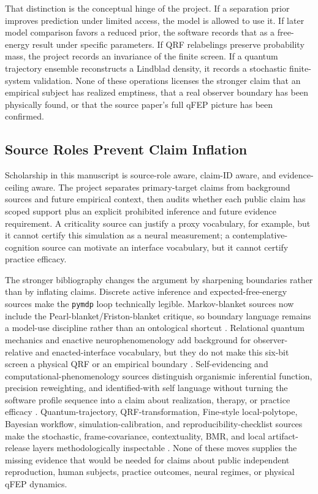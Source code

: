 \documentclass[
]{article}
\begin{document}
That distinction is the conceptual hinge of the project. If a separation
prior improves prediction under limited access, the model is allowed to
use it. If later model comparison favors a reduced prior, the software
records that as a free-energy result under specific parameters. If QRF
relabelings preserve probability mass, the project records an invariance
of the finite screen. If a quantum trajectory ensemble reconstructs a
Lindblad density, it records a stochastic finite-system validation. None
of these operations licenses the stronger claim that an empirical
subject has realized emptiness, that a real observer boundary has been
physically found, or that the source paper's full qFEP picture has been
confirmed.

\subsection{Source Roles Prevent Claim
Inflation}\label{sec:discussion-source-role-boundaries}

Scholarship in this manuscript is source-role aware, claim-ID aware, and
evidence-ceiling aware. The project separates primary-target claims from
background sources and future empirical context, then audits whether
each public claim has scoped support plus an explicit prohibited
inference and future evidence requirement. A criticality source can
justify a proxy vocabulary, for example, but it cannot certify this
simulation as a neural measurement; a contemplative-cognition source can
motivate an interface vocabulary, but it cannot certify practice
efficacy.

The stronger bibliography changes the argument by sharpening boundaries
rather than by inflating claims. Discrete active inference and
expected-free-energy sources make the \texttt{pymdp} loop technically
legible. Markov-blanket sources now include the
Pearl-blanket/Friston-blanket critique, so boundary language remains a
model-use discipline rather than an ontological shortcut
\citep{bruineberg2022emperor}. Relational quantum mechanics and enactive
neurophenomenology add background for observer-relative and
enacted-interface vocabulary, but they do not make this six-bit screen a
physical QRF or an empirical boundary
\citep{rovelli1996relational, varela1991embodied}. Self-evidencing and
computational-phenomenology sources distinguish organismic inferential
function, precision reweighting, and identified-with self language
without turning the software profile sequence into a claim about
realization, therapy, or practice efficacy
\citep{hohwy2026selfevidencingagent, tal2026advancedmeditation, prest2026lettinggo, prest2026selfingwithoutself}.
Quantum-trajectory, QRF-transformation, Fine-style local-polytope,
Bayesian workflow, simulation-calibration, and reproducibility-checklist
sources make the stochastic, frame-covariance, contextuality, BMR, and
local artifact-release layers methodologically inspectable
\citep{fine1982hidden, talts2018sbc, gelman2020bayesianworkflow, pineau2020reproducibility}.
None of these moves supplies the missing evidence that would be needed
for claims about public independent reproduction, human subjects,
practice outcomes, neural regimes, or physical qFEP dynamics.
\end{document}
